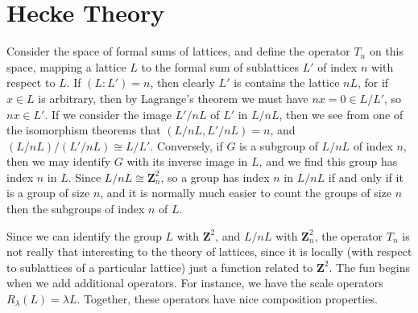 \section{Hecke Theory}

Consider the space of formal sums of lattices, and define the operator $T_n$ on this space, mapping a lattice $L$ to the formal sum of sublattices $L'$ of index $n$ with respect to $L$. If $(L: L') = n$, then clearly $L'$ is contains the lattice $nL$, for if $x \in L$ is arbitrary, then by Lagrange's theorem we must have $nx = 0 \in L/L'$, so $nx \in L'$. If we consider the image $L'/nL$ of $L'$ in $L/nL$, then we see from one of the isomorphism theorems that $(L/nL, L'/nL) = n$, and $(L/nL)/(L'/nL) \cong L/L'$. Conversely, if $G$ is a subgroup of $L/nL$ of index $n$, then we may identify $G$ with its inverse image in $L$, and we find this group has index $n$ in $L$. Since $L/nL \cong \mathbf{Z}_n^2$, so a group has index $n$ in $L/nL$ if and only if it is a group of size $n$, and it is normally much easier to count the groups of size $n$ then the subgroups of index $n$ of $L$.

Since we can identify the group $L$ with $\mathbf{Z}^2$, and $L/nL$ with $\mathbf{Z}_n^2$, the operator $T_n$ is not really that interesting to the theory of lattices, since it is locally (with respect to sublattices of a particular lattice) just a function related to $\mathbf{Z}^2$. The fun begins when we add additional operators. For instance, we have the scale operators $R_\lambda(L) = \lambda L$. Together, these operators have nice composition properties.

